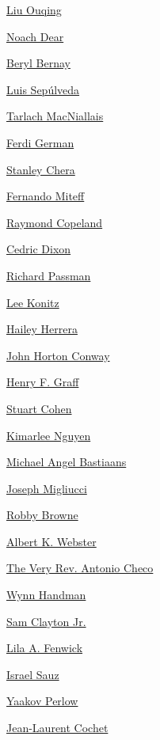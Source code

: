\protect\hyperlink{liu-ouqing}{Liu Ouqing}

\protect\hyperlink{noach-dear}{Noach Dear}

\protect\hyperlink{beryl-bernay}{Beryl Bernay}

\protect\hyperlink{luis-sepuxfalveda}{Luis Sepúlveda}

\protect\hyperlink{tarlach-macniallais}{Tarlach MacNiallais}

\protect\hyperlink{ferdi-german}{Ferdi German}

\protect\hyperlink{stanley-chera}{Stanley Chera}

\protect\hyperlink{fernando-miteff}{Fernando Miteff}

\protect\hyperlink{raymond-copeland}{Raymond Copeland}

\protect\hyperlink{cedric-dixon}{Cedric Dixon}

\protect\hyperlink{richard-passman}{Richard Passman}

\protect\hyperlink{lee-konitz}{Lee Konitz}

\protect\hyperlink{hailey-herrera}{Hailey Herrera}

\protect\hyperlink{john-horton-conway}{John Horton Conway}

\protect\hyperlink{henry-f-graff}{Henry F. Graff}

\protect\hyperlink{stuart-cohen}{Stuart Cohen}

\protect\hyperlink{kimarlee-nguyen}{Kimarlee Nguyen}

\protect\hyperlink{michael-angel-bastiaans}{Michael Angel Bastiaans}

\protect\hyperlink{joseph-migliucci}{Joseph Migliucci}

\protect\hyperlink{robby-browne}{Robby Browne}

\protect\hyperlink{albert-k-webster}{Albert K. Webster}

\protect\hyperlink{the-very-rev-antonio-checo}{The Very Rev. Antonio
Checo}

\protect\hyperlink{wynn-handman}{Wynn Handman}

\protect\hyperlink{sam-clayton-jr-}{Sam Clayton Jr.}

\protect\hyperlink{lila-a-fenwick}{Lila A. Fenwick}

\protect\hyperlink{israel-sauz}{Israel Sauz}

\protect\hyperlink{yaakov-perlow}{Yaakov Perlow}

\protect\hyperlink{jeanlaurent-cochet}{Jean-Laurent Cochet}

